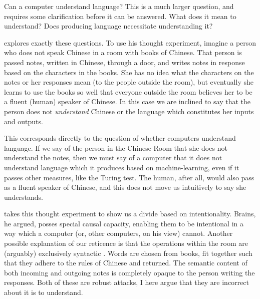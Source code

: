 \documentclass[man,12pt,natbib]{apa6}
\begin{document}
Can a computer understand language?
This is a much larger question, and requires some clarification before it can
be answered. What does it mean to understand? Does producing language
necessitate understanding it?

\citet{Searle80} explores exactly these questions. To use his thought
experiment, imagine a person who does not speak Chinese in a room with books of
Chinese. That person is passed notes, written in Chinese, through a door, and
writes notes in response based on the characters in the books. She has no idea
what the characters on the notes or her responses mean (to the people outside
the room), but eventually she learns to use the books so well that everyone
outside the room believes her to be a fluent (human) speaker of Chinese. In
this case we are inclined to say that the person does not \emph{understand}
Chinese or the language which constitutes her inputs and outputs.

This corresponds directly to the question of whether computers understand
language. If we say of the person in the Chinese Room that she does not
understand the notes, then we must say of a computer that it does not
understand language which it produces based on machine-learning, even if it
passes other measures, like the Turing test. The human, after all, would also
pass as a fluent speaker of Chinese, and this does not move us intuitively to
say she understands.

\citet{Searle80} takes this thought experiment to show us a divide based on
intentionality. Brains, he argued, posses special causal capacity, enabling
them to be intentional in a way which a computer (or, other computers, on his
view) cannot.  Another possible explanation of our reticence is that the
operations within the room are (arguably) exclusively syntactic
\citep{Marconi96}. Words are chosen from books, fit together such that they
adhere to the rules of Chinese and returned. The semantic content of both
incoming and outgoing notes is completely opaque to the person writing the
responses.  Both of these are robust attacks, I here argue that they are
incorrect about it is to understand.
\end{document}
